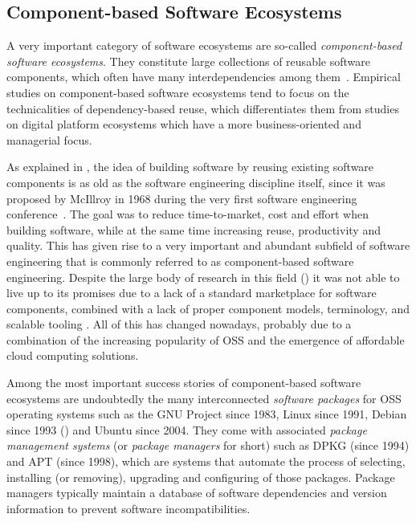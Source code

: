 \subsection{Component-based Software Ecosystems}
\label{INT:sec:CBSECO}

A very important category of software ecosystems are so-called \emph{component-based software ecosystems}.
They constitute large collections of reusable software components, which often have many interdependencies among them~\cite{Abate2009}.
Empirical studies on component-based software ecosystems tend to focus on the technicalities of dependency-based reuse, which differentiates them from studies on digital platform ecosystems which have a more business-oriented and managerial focus.

As explained in , the idea of building software by reusing existing software components is as old as the software engineering discipline itself, since it was proposed by McIllroy in 1968 during the very first software engineering conference~\cite{McIllroy1968}.
The goal was to reduce time-to-market, cost and effort when building software, while at the same time increasing reuse, productivity and quality.
This has given rise to a very important and abundant subfield of software engineering that is commonly referred to as component-based software engineering.
Despite the large body of research in this field (\eg \cite{Caldiera1991,Krueger1992,Szyperski1997}) it was not able to live up to its promises due to a lack of a standard marketplace for software components, combined with a lack of proper component models, terminology, and scalable tooling \cite{Kotovs2009}.
All of this has changed nowadays, probably due to a combination of the increasing popularity of OSS and the emergence of affordable cloud computing solutions.

Among the most important success stories of component-based software ecosystems are undoubtedly the
many interconnected \emph{software packages} for OSS operating systems such as the GNU Project since 1983, Linux since 1991, Debian since 1993 (\eg \cite{Abate2009,gonzalez2009macro,debsources-esem-2014,Claes2015,Claes2018}) and Ubuntu since 2004.
They come with associated \emph{package management systems} (or \emph{package managers} for short) such as DPKG (since 1994) and APT (since 1998), which are systems that automate the process of selecting, installing (or removing), upgrading and configuring of those packages.
Package managers typically maintain a database of software dependencies and version information to prevent software incompatibilities.

